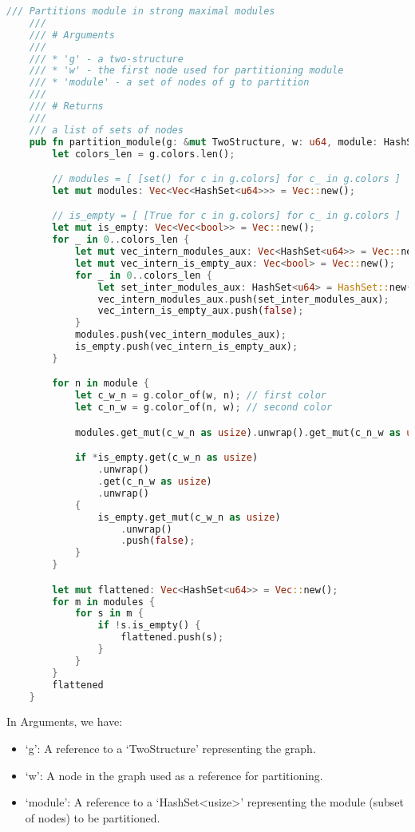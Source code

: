 \begin{lstlisting}[language=Rust, style=rust, caption={Defining the partition module with Rust}, label={lst:rust-define-partition module}, firstnumber=1]
    /// Partitions module in strong maximal modules
    ///
    /// # Arguments
    ///
    /// * 'g' - a two-structure
    /// * 'w' - the first node used for partitioning module
    /// * 'module' - a set of nodes of g to partition
    ///
    /// # Returns
    ///
    /// a list of sets of nodes
    pub fn partition_module(g: &mut TwoStructure, w: u64, module: HashSet<u64>) -> Vec<HashSet<u64>> {
        let colors_len = g.colors.len();

        // modules = [ [set() for c in g.colors] for c_ in g.colors ]
        let mut modules: Vec<Vec<HashSet<u64>>> = Vec::new();

        // is_empty = [ [True for c in g.colors] for c_ in g.colors ]
        let mut is_empty: Vec<Vec<bool>> = Vec::new();
        for _ in 0..colors_len {
            let mut vec_intern_modules_aux: Vec<HashSet<u64>> = Vec::new();
            let mut vec_intern_is_empty_aux: Vec<bool> = Vec::new();
            for _ in 0..colors_len {
                let set_inter_modules_aux: HashSet<u64> = HashSet::new();
                vec_intern_modules_aux.push(set_inter_modules_aux);
                vec_intern_is_empty_aux.push(false);
            }
            modules.push(vec_intern_modules_aux);
            is_empty.push(vec_intern_is_empty_aux);
        }

        for n in module {
            let c_w_n = g.color_of(w, n); // first color
            let c_n_w = g.color_of(n, w); // second color

            modules.get_mut(c_w_n as usize).unwrap().get_mut(c_n_w as usize).unwrap().insert(n);

            if *is_empty.get(c_w_n as usize)
                .unwrap()
                .get(c_n_w as usize)
                .unwrap()
            {
                is_empty.get_mut(c_w_n as usize)
                    .unwrap()
                    .push(false);
            }
        }

        let mut flattened: Vec<HashSet<u64>> = Vec::new();
        for m in modules {
            for s in m {
                if !s.is_empty() {
                    flattened.push(s);
                }
            }
        }
        flattened
    }
\end{lstlisting}

In Arguments, we have:
\begin{itemize}
    \item `g': A reference to a `TwoStructure' representing the graph.
    \item `w': A node in the graph used as a reference for partitioning.
    \item `module': A reference to a `HashSet<usize>' representing the module (subset of nodes) to be partitioned.
\end{itemize}

